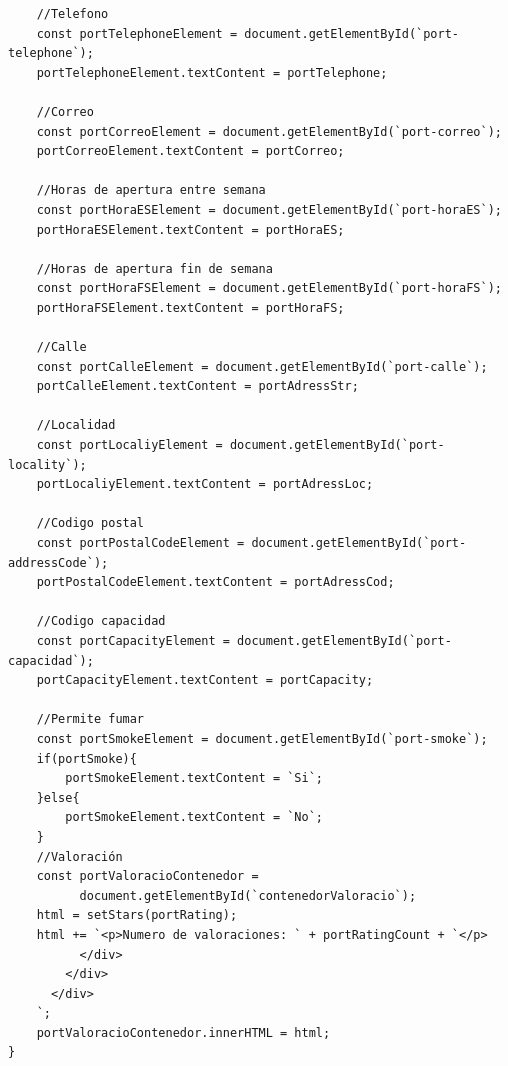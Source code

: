\documentclass{article}
\begin{document}
\begin{itemize}
\begin{verbatim}
    //Telefono
    const portTelephoneElement = document.getElementById(`port-telephone`);
    portTelephoneElement.textContent = portTelephone;

    //Correo
    const portCorreoElement = document.getElementById(`port-correo`);
    portCorreoElement.textContent = portCorreo;

    //Horas de apertura entre semana
    const portHoraESElement = document.getElementById(`port-horaES`);
    portHoraESElement.textContent = portHoraES;

    //Horas de apertura fin de semana
    const portHoraFSElement = document.getElementById(`port-horaFS`);
    portHoraFSElement.textContent = portHoraFS;

    //Calle
    const portCalleElement = document.getElementById(`port-calle`);
    portCalleElement.textContent = portAdressStr;

    //Localidad
    const portLocaliyElement = document.getElementById(`port-locality`);
    portLocaliyElement.textContent = portAdressLoc;

    //Codigo postal
    const portPostalCodeElement = document.getElementById(`port-addressCode`);
    portPostalCodeElement.textContent = portAdressCod;

    //Codigo capacidad
    const portCapacityElement = document.getElementById(`port-capacidad`);
    portCapacityElement.textContent = portCapacity;

    //Permite fumar
    const portSmokeElement = document.getElementById(`port-smoke`);
    if(portSmoke){
        portSmokeElement.textContent = `Si`;
    }else{  
        portSmokeElement.textContent = `No`;
    }
    //Valoración
    const portValoracioContenedor = 
          document.getElementById(`contenedorValoracio`);
    html = setStars(portRating);
    html += `<p>Numero de valoraciones: ` + portRatingCount + `</p>
          </div>
        </div>
      </div>
    `;
    portValoracioContenedor.innerHTML = html;
}


\end{verbatim}
\end{itemize}
\end{document}
